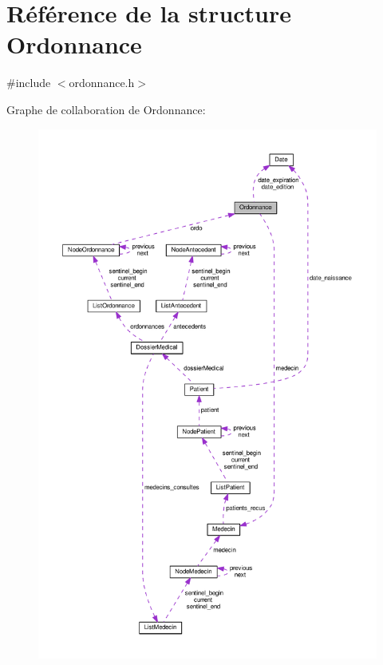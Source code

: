 \hypertarget{struct_ordonnance}{\section{Référence de la structure Ordonnance}
\label{struct_ordonnance}
}


{\ttfamily \#include $<$ordonnance.\-h$>$}



Graphe de collaboration de Ordonnance\-:
\nopagebreak
\begin{figure}[H]
\begin{center}
\leavevmode
\includegraphics[width=350pt]{struct_ordonnance__coll__graph}
\end{center}
\end{figure}

